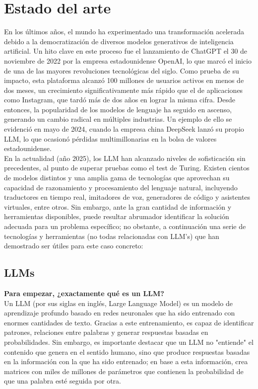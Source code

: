 \documentclass{article}
\begin{document}
\section{Estado del arte}
En los últimos años, el mundo ha experimentado una transformación acelerada debido a la democratización de diversos modelos generativos de inteligencia artificial. Un hito clave en este proceso fue el lanzamiento de ChatGPT el 30 de noviembre de 2022 por la empresa estadounidense OpenAI, lo que marcó el inicio de una de las mayores revoluciones tecnológicas del siglo. Como prueba de su impacto, esta plataforma alcanzó 100 millones de usuarios activos en menos de dos meses, un crecimiento significativamente más rápido que el de aplicaciones como Instagram, que tardó más de dos años en lograr la misma cifra. Desde entonces, la popularidad de los modelos de lenguaje ha seguido en ascenso, generando un cambio radical en múltiples industrias. Un ejemplo de ello se evidenció en mayo de 2024, cuando la empresa china DeepSeek lanzó su propio LLM, lo que ocasionó pérdidas multimillonarias en la bolsa de valores estadounidense. \\
En la actualidad (año 2025), los LLM han alcanzado niveles de sofisticación sin precedentes, al punto de superar pruebas como el test de Turing. Existen cientos de modelos distintos y una amplia gama de tecnologías que aprovechan su capacidad de razonamiento y procesamiento del lenguaje natural, incluyendo traductores en tiempo real, imitadores de voz, generadores de código y asistentes virtuales, entre otros. Sin embargo, ante la gran cantidad de información y herramientas disponibles, puede resultar abrumador identificar la solución adecuada para un problema específico; no obstante, a continuación una serie de tecnologías y herramientas (no todas relacionadas con LLM's) que han demostrado ser útiles para este caso concreto:

\subsection{LLMs}
\textbf{Para empezar, ¿exactamente qué es un LLM?} \\
Un LLM (por sus siglas en inglés, Large Language Model) es un modelo de aprendizaje profundo basado en redes neuronales que ha sido entrenado con enormes cantidades de texto. Gracias a este entrenamiento, es capaz de identificar patrones, relaciones entre palabras y generar respuestas basadas en probabilidades. Sin embargo, es importante destacar que un LLM no "entiende" el contenido que genera en el sentido humano, sino que produce respuestas basadas en la información con la que ha sido entrenado; en base a esta información, crea matrices con miles de millones de parámetros que contienen la probabilidad de que una palabra esté seguida por otra. \\
\end{document}
